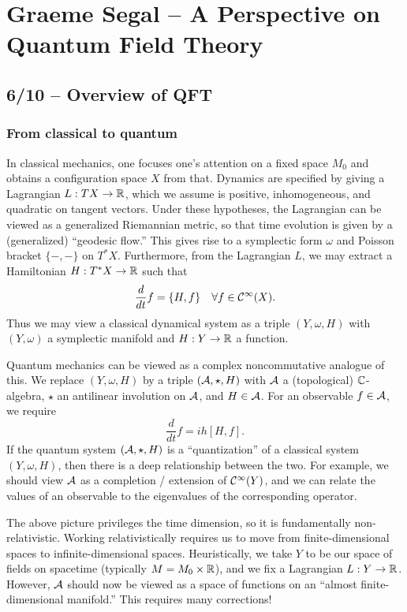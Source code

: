 \chapter{Graeme Segal -- A Perspective on Quantum Field Theory}

\section{6/10 -- Overview of QFT}

\subsection{From classical to quantum}

In classical mechanics, one focuses one's attention on a fixed space $M_0$ and obtains a configuration space $X$ from that.
Dynamics are specified by giving a Lagrangian $L: TX \to \mathbb{R}$, which we assume is positive, inhomogeneous, and quadratic on tangent vectors.
Under these hypotheses, the Lagrangian can be viewed as a generalized Riemannian metric, so that time evolution is given by a (generalized) ``geodesic flow.''
This gives rise to a symplectic form $\omega$ and Poisson bracket $\{-,-\}$ on $T^* X$.
Furthermore, from the Lagrangian $L$, we may extract a Hamiltonian $H: T^*X \to \mathbb{R}$ such that
\[
	\frac{d}{dt} f = \{ H, f \} \hspace{1em} \forall f \in \mathcal{C}^\infty(X).
\]
Thus we may view a classical dynamical system as a triple $(Y, \omega, H)$ with $(Y, \omega)$ a symplectic manifold and $H: Y \to \mathbb{R}$ a function.

Quantum mechanics can be viewed as a complex noncommutative analogue of this.
We replace $(Y, \omega, H)$ by a triple $(\mathcal{A}, \star, H)$ with $\mathcal{A}$ a (topological) $\mathbb{C}$-algebra, $\star$ an antilinear involution on $\mathcal{A}$, and $H \in \mathcal{A}$.
For an observable $f \in \mathcal{A}$, we require
\[
	\frac{d}{dt} f = i h [H, f].
\]
If the quantum system $(\mathcal{A}, \star, H)$ is a ``quantization'' of a classical system $(Y, \omega, H)$, then there is a deep relationship between the two.
For example, we should view $\mathcal{A}$ as a completion / extension of $\mathcal{C}^\infty(Y)$, and we can relate the values of an observable to the eigenvalues of the corresponding operator.

The above picture privileges the time dimension, so it is fundamentally non-relativistic.
Working relativistically requires us to move from finite-dimensional spaces to infinite-dimensional spaces.
Heuristically, we take $Y$ to be our space of fields on spacetime (typically $M = M_0 \times \mathbb{R}$), and we fix a Lagrangian $L: Y \to \mathbb{R}$.
However, $\mathcal{A}$ should now be viewed as a space of functions on an ``almost finite-dimensional manifold.''
This requires many corrections! 

